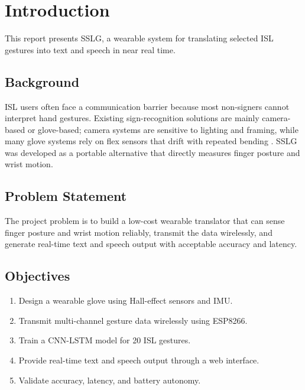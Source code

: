 \documentclass[12pt,a4paper]{report}
\begin{document}

\setcounter{page}{1}


\chapter{Introduction}

This report presents SSLG, a wearable system for translating selected ISL gestures into text and speech in near real time.

\section{Background}
\label{sec:intro_background}

ISL users often face a communication barrier because most non-signers cannot interpret hand gestures. Existing sign-recognition solutions are mainly camera-based or glove-based; camera systems are sensitive to lighting and framing, while many glove systems rely on flex sensors that drift with repeated bending \cite{mitra}. SSLG was developed as a portable alternative that directly measures finger posture and wrist motion.

\section{Problem Statement}
\label{sec:intro_problem}

The project problem is to build a low-cost wearable translator that can sense finger posture and wrist motion reliably, transmit the data wirelessly, and generate real-time text and speech output with acceptable accuracy and latency.

\section{Objectives}
\label{sec:intro_objectives}

\begin{enumerate}[label=\arabic*.]
  \item Design a wearable glove using Hall-effect sensors and IMU.
  \item Transmit multi-channel gesture data wirelessly using ESP8266.
  \item Train a CNN-LSTM model for 20 ISL gestures.
  \item Provide real-time text and speech output through a web interface.
  \item Validate accuracy, latency, and battery autonomy.
\end{enumerate}
\end{document}
